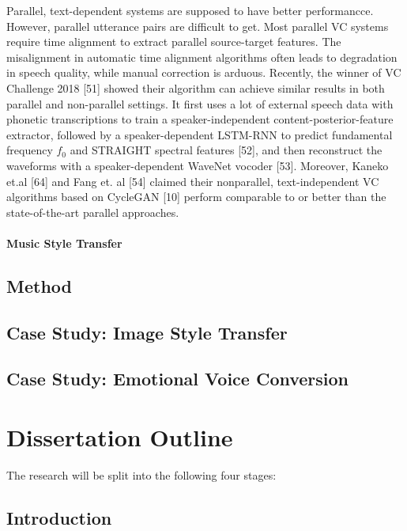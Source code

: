 \documentclass{article}
\begin{document}
Parallel, text-dependent systems are supposed to have better performancce. However, parallel utterance pairs are difficult to get. Most parallel VC systems require time alignment to extract parallel source-target features. The misalignment in automatic time alignment algorithms often leads to degradation in speech quality, while manual correction is arduous. Recently, the winner of VC Challenge 2018 [51] showed their algorithm can achieve similar results in both parallel and non-parallel settings. It first uses a lot of external speech data with phonetic transcriptions to train a speaker-independent content-posterior-feature extractor, followed by a speaker-dependent LSTM-RNN to predict fundamental frequency $f_0$ and STRAIGHT spectral features [52], and then reconstruct the waveforms with a speaker-dependent WaveNet vocoder [53]. Moreover, Kaneko et.al [64] and Fang et. al [54] claimed their nonparallel, text-independent VC algorithms based on CycleGAN [10] perform comparable to or better than the state-of-the-art parallel approaches.


\paragraph{Music Style Transfer}



\subsection{Method}

\subsection{Case Study: Image Style Transfer}

\subsection{Case Study: Emotional Voice Conversion}



\section{Dissertation Outline}
\label{Sec:Outline}

The research will be split into the following four stages:

\subsection{Introduction}
\end{document}
